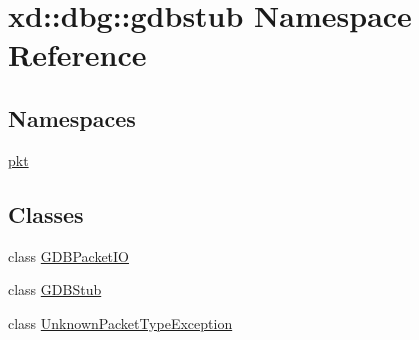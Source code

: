 \hypertarget{namespacexd_1_1dbg_1_1gdbstub}{}\section{xd\+:\+:dbg\+:\+:gdbstub Namespace Reference}
\label{namespacexd_1_1dbg_1_1gdbstub}
\subsection*{Namespaces}
\begin{DoxyCompactItemize}
\item 
 \mbox{\hyperlink{namespacexd_1_1dbg_1_1gdbstub_1_1pkt}{pkt}}
\end{DoxyCompactItemize}
\subsection*{Classes}
\begin{DoxyCompactItemize}
\item 
class \mbox{\hyperlink{classxd_1_1dbg_1_1gdbstub_1_1_g_d_b_packet_i_o}{G\+D\+B\+Packet\+IO}}
\item 
class \mbox{\hyperlink{classxd_1_1dbg_1_1gdbstub_1_1_g_d_b_stub}{G\+D\+B\+Stub}}
\item 
class \mbox{\hyperlink{classxd_1_1dbg_1_1gdbstub_1_1_unknown_packet_type_exception}{Unknown\+Packet\+Type\+Exception}}
\end{DoxyCompactItemize}
